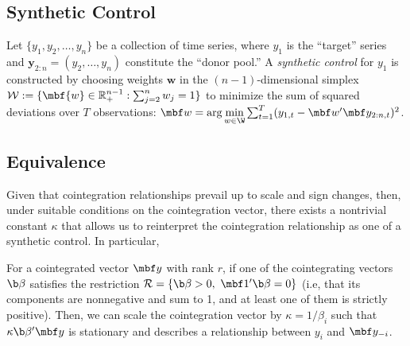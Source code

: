 \subsection{Synthetic Control}

\begin{definition}
Let $\{y_1, y_2, \dots, y_n\}$ be a collection of time series, where $y_1$ is the ``target'' series and 
$\mathbf{y}_{2:n} = (y_2,\dots,y_n)$ constitute the ``donor pool.'' A \emph{synthetic control} for 
$y_1$ is constructed by choosing weights $\mathbf{w}$ in the $(n-1)$-dimensional simplex
$\mathcal{W} := \{\mbf{w}\in\mathbb{R}_{+}^{n-1}: \sum_{j=2}^n w_j=1\}$
to minimize the sum of squared deviations over $T$ observations:
$\mbf w=\arg\underset{w\in\W}{\min} \sum_{t=1}^T (y_{1,t}-\mbf w'\mbf y_{2:n,t})^2$.
\end{definition}



\subsection{Equivalence}
Given that cointegration relationships prevail up to scale and sign changes, then, under suitable conditions on the cointegration vector, there exists a nontrivial constant $\kappa$ that allows us to reinterpret the cointegration relationship as one of a synthetic control. In particular,

\begin{proposition} For a cointegrated vector $\mbf y$  with rank $r$, if one of the cointegrating vectors $\b \beta$ satisfies the restriction
$\mathcal R=
\{
\b \beta > 0, ~
\mbf 1' \b \beta  = 0
\}$ 
(i.e, 
 that its components are nonnegative and sum to 1, and at least one of them is strictly positive). Then, we can scale the cointegration vector by $\kappa=1/\beta_i$ such that $\kappa \b \beta ' \mbf y$ is stationary and describes a  relationship between $y_i$ and $\mbf y_{-i}$. 
\end{proposition}

